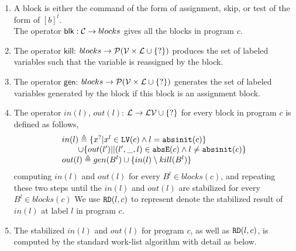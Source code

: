 \begin{enumerate}
\item 
A block is either the command of the form of assignment, skip, or test of the form of $[b]^{l}$.\\
The operator $\mathsf{blk}: \mathcal{C} \to blocks$ gives all the blocks in program $c$.
\item The operator $\mathsf{kill}$: $blocks \to \mathcal{P}(\mathcal{V} \times \mathcal{L} \cup \{?\})$ produces the set of labeled variables such that the variable is reassigned by the block.
\item The operator $\mathsf{gen}$: $blocks \to \mathcal{P}(\mathcal{V} \times \mathcal{L} \cup \{?\})$ generates the set of labeled variables generated by the block if this block is an assignment block.
\item The operator $in(l)$, $out(l)$: $ \mathcal{L} \to \mathcal{LV} \cup \{?\}$ for every block in program $c$ is defined as follows,
 \[
 \begin{array}{ll}
 in(l) \triangleq \{ x^{?} | x^l \in \mathtt{LV}(c) \land l = \mathtt{abs}{\mathtt{init}}(c) \} 
 \\ \quad \quad \cup \{ out(l')| | (l',\_, l) \in \mathtt{abs}{\mathtt{E}}(c) \land l \neq \mathtt{abs}{\mathtt{init}}(c)\} \\
 out(l) \triangleq gen(B^{l}) \cup \{ in(l) \setminus kill(B^l) \} 
 \end{array}
 \]
computing $in(l)$ and $out(l)$ for every $B^l \in blocks(c) $, and repeating these two steps
until the $in(l)$ and $out(l)$ are stabilized for every $B^l \in blocks(c) $
We use $\mathtt{RD}(l,c)$ to represent 
denote the stabilized result of $in(l)$ at label $l$ in program $c$. 
%
\item The stabilized $in(l)$ and $out(l)$ for program $c$, as well as $\mathtt{RD}(l, c)$,
is computed by the standard work-list algorithm with detail as below. 
\begin{algorithm}

\end{algorithm}
\end{enumerate}
